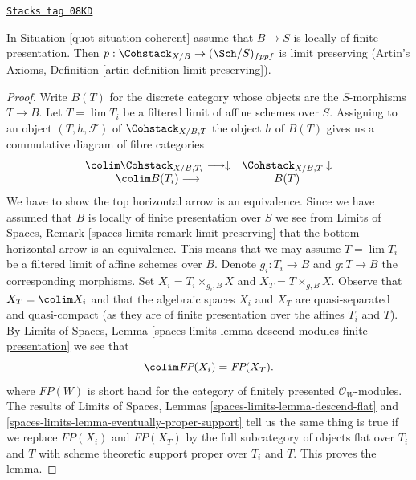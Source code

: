 \begin{lemma}
\label{quot-lemma-coherent-limits}
\href{https://stacks.math.columbia.edu/tag/08KD}{\texttt{Stacks tag 08KD}}

In Situation \ref{quot-situation-coherent} assume that $B \to S$
is locally of finite presentation. Then
$p : \Cohstack_{X/B} \to (\Sch/S)_{fppf}$ is limit preserving
(Artin's Axioms, Definition \ref{artin-definition-limit-preserving}).
\end{lemma}

\begin{proof}
Write $B(T)$ for the discrete category whose
objects are the $S$-morphisms $T \to B$. Let $T = \lim T_i$ be a filtered
limit of affine schemes over $S$. Assigning to an object
$(T, h, \mathcal{F})$ of $\Cohstack_{X/B, T}$ the object $h$
of $B(T)$ gives us a commutative diagram of fibre categories
$$
\begin{array}{cc}\colim \Cohstack_{X/B, T_i} \longrightarrow\downarrow & \Cohstack_{X/B, T} \downarrow \\ \colim B(T_i) \longrightarrow & B(T)\end{array}
$$
We have to show the top horizontal arrow is an equivalence. Since
we have assumed that $B$ is locally of finite presentation over $S$
we see from
Limits of Spaces, Remark \ref{spaces-limits-remark-limit-preserving}
that the bottom horizontal arrow is an equivalence. This means that
we may assume $T = \lim T_i$ be a filtered limit of affine schemes over
$B$. Denote $g_i : T_i \to B$ and $g : T \to B$ the corresponding
morphisms. Set $X_i = T_i \times_{g_i, B} X$ and $X_T = T \times_{g, B} X$.
Observe that $X_T = \colim X_i$ and that the algebraic spaces
$X_i$ and $X_T$ are quasi-separated and quasi-compact (as they
are of finite presentation over the affines $T_i$ and $T$).
By Limits of Spaces, Lemma
\ref{spaces-limits-lemma-descend-modules-finite-presentation}
we see that
$$
\colim \textit{FP}(X_i) = \textit{FP}(X_T).
$$
where $\textit{FP}(W)$ is short hand for the category of finitely
presented $\mathcal{O}_W$-modules. The results of
Limits of Spaces, Lemmas \ref{spaces-limits-lemma-descend-flat} and
\ref{spaces-limits-lemma-eventually-proper-support}
tell us the same thing is true if we replace $\textit{FP}(X_i)$
and $\textit{FP}(X_T)$ by the full subcategory of objects
flat over $T_i$ and $T$ with scheme theoretic support proper
over $T_i$ and $T$. This proves the lemma.
\end{proof}

